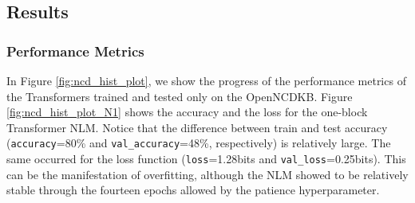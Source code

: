 \documentclass[preprint]{elsarticle}
\begin{document}
\subsection{Results}

\subsubsection{Performance Metrics}

In Figure \ref{fig:ncd_hist_plot}, we show the progress of the performance metrics of the Transformers trained and tested only on the OpenNCDKB. Figure \ref{fig:ncd_hist_plot_N1} shows the accuracy and the loss for the one-block Transformer NLM. Notice that the difference between train and test accuracy (\texttt{accuracy}=80\% and \texttt{val\_accuracy}=48\%, respectively) is relatively large. The same occurred for the loss function (\texttt{loss}=1.28bits and \texttt{val\_loss}=0.25bits). This can be the manifestation of overfitting, although the NLM showed to be relatively stable through the fourteen epochs allowed by the patience hyperparameter.
\end{document}
